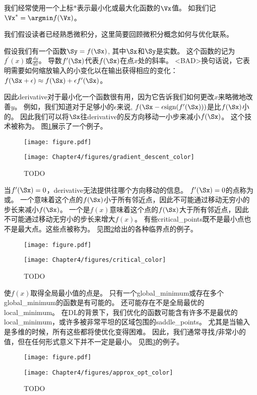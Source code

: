 我们经常使用一个上标$*$表示最小化或最大化函数的$\Vx$值。
如我们记$\Vx^*=\argmin f(\Vx)$。

我们假设读者已经熟悉微积分，这里简要回顾微积分概念如何与优化联系。


假设我们有一个函数$\Sy = f(\Sx)$, 其中$\Sx$和$\Sy$是实数。
这个函数的记为$f^\prime(x)$或$\frac{dy}{dx}$。
导数$f^\prime(\Sx)$代表$f(\Sx)$在点$x$处的斜率。
<BAD>换句话说，它表明需要如何缩放输入的小变化以在输出获得相应的变化：
$f(\Sx+\epsilon) \approx f(\Sx) + \epsilon f^\prime(\Sx) $。

因此\gls{derivative}对于最小化一个函数很有用，因为它告诉我们如何更改$x$来略微地改善$y$。
例如，我们知道对于足够小的$\epsilon$来说, $f(\Sx-\epsilon \text{sign}(f^\prime(\Sx)) )$是比$f(\Sx)$小的。
因此我们可以将$\Sx$往\gls{derivative}的反方向移动一小步来减小$f(\Sx)$。
这个技术被称为\citep{cauchy1847}。
图\ref{fig:chap4_gradient_descent_color}展示了一个例子。
\begin{figure}[!htb]
\ifOpenSource
\centerline{\texttt{[image: figure.pdf]}}
\else
\centerline{\texttt{[image: Chapter4/figures/gradient\_descent\_color]}}
\fi
\caption{TODO}
\label{fig:chap4_gradient_descent_color}
\end{figure}


当$f^\prime(\Sx)=0$，\gls{derivative}无法提供往哪个方向移动的信息。
$ f^\prime(\Sx)=0 $的点称为或。
一个意味着这个点的$f(\Sx)$小于所有邻近点，因此不可能通过移动无穷小的步长来减小$f(\Sx)$。
一个是$f(x)$意味着这个点的$f(\Sx)$大于所有邻近点，因此不可能通过移动无穷小的步长来增大$f(x)$。
有些\gls{critical_points}既不是最小点也不是最大点。这些点被称为。
见图\ref{fig:chap4_critical_color}给出的各种临界点的例子。
\begin{figure}[!htb]
\ifOpenSource
\centerline{\texttt{[image: figure.pdf]}}
\else
\centerline{\texttt{[image: Chapter4/figures/critical\_color]}}
\fi
\caption{TODO}
\label{fig:chap4_critical_color}
\end{figure}

使$f(x)$取得全局最小值的点是。
只有一个\gls{global_minimum}或存在多个\gls{global_minimum}的函数是有可能的。
还可能存在不是全局最优的\gls{local_minimum}。
在\gls{DL}的背景下，我们优化的函数可能含有许多不是最优的\gls{local_minimum}，或许多被非常平坦的区域包围的\gls{saddle_points}。
尤其是当输入是多维的时候，所有这些都将使优化变得困难。
因此，我们通常寻找$f$非常小的值，但在任何形式意义下并不一定是最小。
见图\ref{fig:chap4_approx_opt_color}的例子。
\begin{figure}[!htb]
\ifOpenSource
\centerline{\texttt{[image: figure.pdf]}}
\else
\centerline{\texttt{[image: Chapter4/figures/approx\_opt\_color]}}
\fi
\caption{TODO}
\label{fig:chap4_approx_opt_color}
\end{figure}

